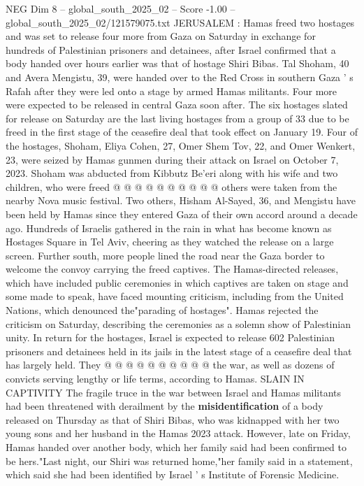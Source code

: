\begin{textsample}{NEG Dim 8 – global\_south\_2025\_02 – Score -1.00 – global\_south\_2025\_02/121579075.txt}  \label{ex:f8_neg_372}
JERUSALEM : Hamas freed two hostages and was set to release four more from Gaza on Saturday in exchange for hundreds of Palestinian prisoners and detainees, after Israel confirmed that a body handed over hours earlier was that of hostage Shiri Bibas.
Tal Shoham, 40 and Avera Mengistu, 39, were handed over to the Red Cross in southern Gaza ' s Rafah after they were led onto a stage by armed Hamas militants.
Four more were expected to be released in central Gaza soon after.
The six hostages slated for release on Saturday are the last living hostages from a group of 33 due to be freed in the first stage of the ceasefire deal that took effect on January 19.
Four of the hostages, Shoham, Eliya Cohen, 27, Omer Shem Tov, 22, and Omer Wenkert, 23, were seized by Hamas gunmen during their attack on Israel on October 7, 2023.
Shoham was abducted from Kibbutz Be'eri along with his wife and two children, who were freed @ @ @ @ @ @ @ @ @ @ others were taken from the nearby Nova music festival.
Two others, Hisham Al-Sayed, 36, and Mengistu have been held by Hamas since they entered Gaza of their own accord around a decade ago.
Hundreds of Israelis gathered in the rain in what has become known as Hostages Square in Tel Aviv, cheering as they watched the release on a large screen.
Further south, more people lined the road near the Gaza border to welcome the convoy carrying the freed captives.
The Hamas-directed releases, which have included public ceremonies in which captives are taken on stage and some made to speak, have faced mounting criticism, including from the United Nations, which denounced the"parading of hostages".
Hamas rejected the criticism on Saturday, describing the ceremonies as a solemn show of Palestinian unity.
In return for the hostages, Israel is expected to release 602 Palestinian prisoners and detainees held in its jails in the latest stage of a ceasefire deal that has largely held.
They @ @ @ @ @ @ @ @ @ @ the war, as well as dozens of convicts serving lengthy or life terms, according to Hamas.
SLAIN IN CAPTIVITY The fragile truce in the war between Israel and Hamas militants had been threatened with derailment by the \textbf{misidentification} of a body released on Thursday as that of Shiri Bibas, who was kidnapped with her two young sons and her husband in the Hamas 2023 attack.
However, late on Friday, Hamas handed over another body, which her family said had been confirmed to be hers."Last night, our Shiri was returned home,"her family said in a statement, which said she had been identified by Israel ' s Institute of Forensic Medicine.

\end{textsample}
